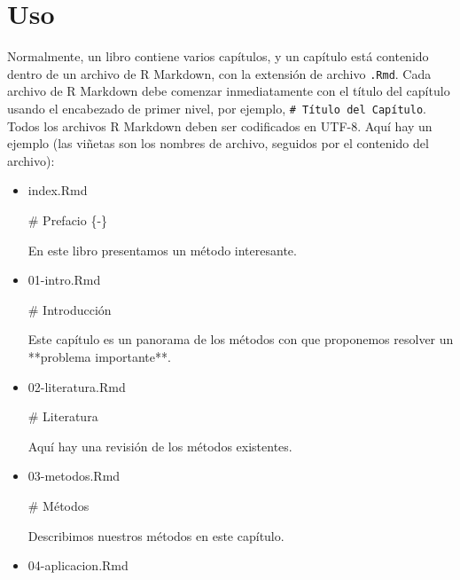 \documentclass[12pt,]{krantz}
\makeatletter
\newenvironment{Shaded}{\begin{snugshade}}{\end{snugshade}}
\newcommand{\FunctionTok}[1]{\textcolor[rgb]{0.00,0.00,0.00}{#1}}
\newcommand{\NormalTok}[1]{#1}
\newenvironment{kframe}{%
\medskip{}
\setlength{\fboxsep}{.8em}
 \def\at@end@of@kframe{}%
 \ifinner\ifhmode%
  \def\at@end@of@kframe{\end{minipage}}%
  \begin{minipage}{\columnwidth}%
 \fi\fi%
 \def\FrameCommand##1{\hskip\@totalleftmargin \hskip-\fboxsep
 \colorbox{shadecolor}{##1}\hskip-\fboxsep
     \hskip-\linewidth \hskip-\@totalleftmargin \hskip\columnwidth}%
 \MakeFramed {\advance\hsize-\width
   \@totalleftmargin\z@ \linewidth\hsize
   \@setminipage}}%
 {\par\unskip\endMakeFramed%
 \at@end@of@kframe}
\renewenvironment{Shaded}{\begin{kframe}}{\end{kframe}}
\theoremstyle{definition}
\theoremstyle{definition}
\theoremstyle{definition}
\theoremstyle{remark}
\makeatother
\begin{document}
\section{Uso}\label{uso}

Normalmente, un libro contiene varios capítulos, y un capítulo está
contenido dentro de un archivo de R Markdown, con la extensión de
archivo \texttt{.Rmd}. Cada archivo de R Markdown debe comenzar
inmediatamente con el título del capítulo usando el encabezado de primer
nivel, por ejemplo, \texttt{\#\ Título\ del\ Capítulo}. Todos los
archivos R Markdown deben ser codificados en UTF-8. Aquí hay un ejemplo
(las viñetas son los nombres de archivo, seguidos por el contenido del
archivo):

\begin{itemize}
\item
  index.Rmd

\begin{Shaded}
\begin{Highlighting}[]
\FunctionTok{# Prefacio \{-\}}

\NormalTok{En este libro presentamos un método interesante.}
\end{Highlighting}
\end{Shaded}
\item
  01-intro.Rmd

\begin{Shaded}
\begin{Highlighting}[]
\FunctionTok{# Introducción}

\NormalTok{Este capítulo es un panorama de los métodos con que proponemos resolver un  **problema importante**.}
\end{Highlighting}
\end{Shaded}
\item
  02-literatura.Rmd

\begin{Shaded}
\begin{Highlighting}[]
\FunctionTok{# Literatura}

\NormalTok{Aquí hay una revisión de los métodos existentes.}
\end{Highlighting}
\end{Shaded}
\item
  03-metodos.Rmd

\begin{Shaded}
\begin{Highlighting}[]
\FunctionTok{# Métodos}

\NormalTok{Describimos nuestros métodos en este capítulo.}
\end{Highlighting}
\end{Shaded}
\item
  04-aplicacion.Rmd


\end{itemize}
\end{document}
